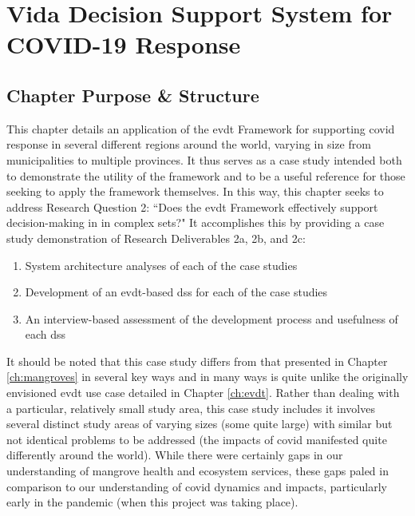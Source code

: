 \chapter{Vida Decision Support System for COVID-19 Response} \label{ch:vida}


\section{Chapter Purpose \& Structure} \label{sec:vida-purpose}

This chapter details an application of the \acf{evdt} Framework for supporting \ac{covid} response in several different regions around the world, varying in size from municipalities to multiple provinces. It thus serves as a case study intended both to demonstrate the utility of the framework and to be a useful reference for those seeking to apply the framework themselves. In this way, this chapter seeks to address Research Question 2: ``Does the \ac{evdt} Framework effectively support decision-making in in complex \ac{sets}?" It accomplishes this by providing a case study demonstration of Research Deliverables 2a, 2b, and 2c: 

\begin{enumerate}[label=\emph{\alph*},itemsep=0pt,parsep=0pt]
	\item{System architecture analyses of each of the case studies} 
	\item{Development of an \ac{evdt}-based \acf{dss} for each of the case studies} 
	\item{An interview-based assessment of the development process and usefulness of each \ac{dss}} 
\end{enumerate}

It should be noted that this case study differs from that presented in Chapter \ref{ch:mangroves} in several key ways and in many ways is quite unlike the originally envisioned \ac{evdt} use case detailed in Chapter \ref{ch:evdt}. Rather than dealing with a particular, relatively small study area, this case study includes it involves several distinct study areas of varying sizes (some quite large) with similar but not identical problems to be addressed (the impacts of \ac{covid} manifested quite differently around the world). While there were certainly gaps in our understanding of mangrove health and ecosystem services, these gaps paled in comparison to our understanding of \ac{covid} dynamics and impacts, particularly early in the pandemic (when this project was taking place). 

